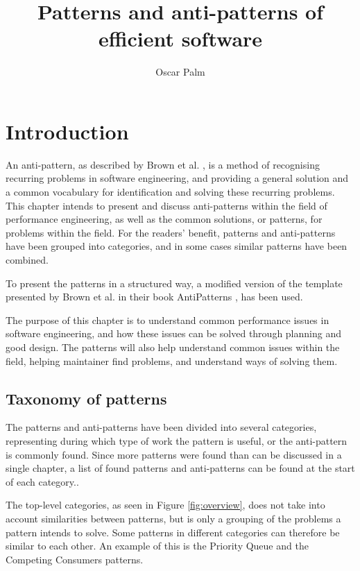 \documentclass[a4paper,UKenglish]{dagrep}
\title{Patterns and anti-patterns of efficient software}
\author[1]{Oscar Palm}
\affil[1]{Chalmers University of Technology, Sweden
  \texttt{nilsosc@chalmers.se}}
\begin{document}
\maketitle





\section{Introduction}
An anti-pattern, as described by Brown et al. \cite{brown1998antipatterns}, is a method of recognising recurring problems in software engineering, and providing a general solution and a common vocabulary for identification and solving these recurring problems. This chapter intends to present and discuss anti-patterns within the field of performance engineering, as well as the common solutions, or patterns, for problems within the field.
For the readers' benefit, patterns and anti-patterns have been grouped into categories, and in some cases similar patterns have been combined.

To present the patterns in a structured way, a modified version of the template presented  by Brown et al. in their book AntiPatterns \cite{brown1998antipatterns}, has been used.


The purpose of this chapter is to understand common performance issues in software engineering, and how these issues can be solved through planning and good design. The patterns will also help understand common issues within the field, helping maintainer find problems, and understand ways of solving them.

\subsection{Taxonomy of patterns}
The patterns  and anti-patterns have been divided into several categories, representing during which type of work the pattern is useful, or the anti-pattern is commonly found. Since more patterns were found than can be discussed in a single chapter, a list of found patterns and anti-patterns can be found at the start of each category.. %

The top-level categories, as seen in Figure \ref{fig:overview}, does not take into account similarities between patterns, but is only a grouping of the problems a pattern intends to solve. Some patterns in different categories can therefore be similar to each other. An example of this is the Priority Queue and the Competing Consumers patterns.
\end{document}
